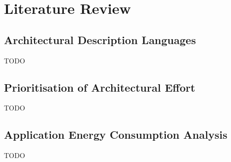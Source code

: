 \chapter{Literature Review}

\section{Architectural Description Languages}
\label{sec:adl-lit-review}

TODO

\section{Prioritisation of Architectural Effort}

TODO

\section{Application Energy Consumption Analysis} \label{sec:litreviewenergy}

TODO
